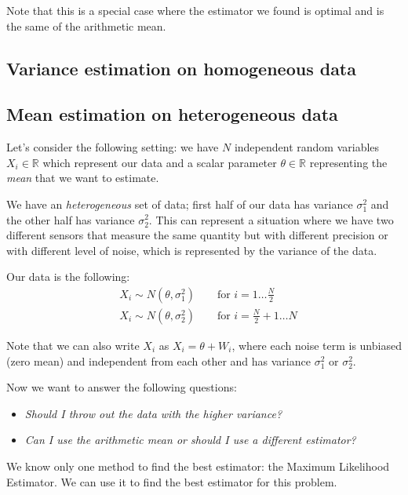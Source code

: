 Note that this is a special case where the estimator we found is optimal and is the same of the arithmetic mean.

\subsection{Variance estimation on homogeneous data}
\subsection{Mean estimation on heterogeneous data}

Let's consider the following setting: we have $N$ independent random variables $X_i \in \mathbb{R}$ which represent our data and a scalar parameter $\theta \in \mathbb{R}$ representing the \textit{mean} that we want to estimate.

We have an \textit{heterogeneous} set of data; first half of our data has variance $\sigma_1^2$ and the other half has variance $\sigma_2^2$. This can represent a situation where we have two different sensors that measure the same quantity but with different precision or with different level of noise, which is represented by the variance of the data.

Our data is the following:
\begin{align*}
     & X_i \sim N(\theta, \sigma_1^2) \qquad \text{for } i = 1 \dots \frac{N}{2}     \\
     & X_i \sim N(\theta, \sigma_2^2) \qquad \text{for } i = \frac{N}{2} + 1 \dots N
\end{align*}

Note that we can also write $X_i$ as $X_i = \theta + W_i$, where each noise term is unbiased (zero mean) and independent from each other and has variance $\sigma_1^2$ or $\sigma_2^2$.

Now we want to answer the following questions:
\begin{itemize}
    \item \textit{Should I throw out the data with the higher variance?}
    \item \textit{Can I use the arithmetic mean or should I use a different estimator?}
\end{itemize}

We know only one method to find the best estimator: the Maximum Likelihood Estimator. We can use it to find the best estimator for this problem.

